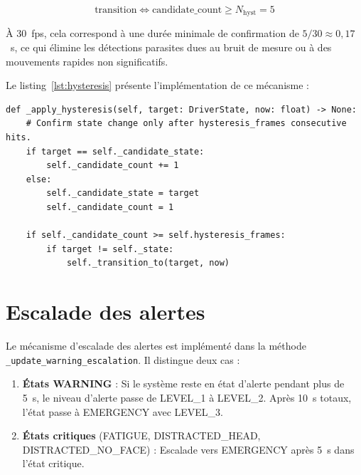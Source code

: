 \documentclass[12pt,a4paper]{report}
\begin{document}
\begin{equation}
  \text{transition} \iff \text{candidate\_count} \geq N_{\text{hyst}} = 5
\end{equation}

\`A 30~fps, cela correspond \`a une dur\'ee minimale de confirmation de $5/30 \approx 0{,}17$~s, ce qui \'elimine les d\'etections parasites dues au bruit de mesure ou \`a des mouvements rapides non significatifs.

Le listing~\ref{lst:hysteresis} pr\'esente l'impl\'ementation de ce m\'ecanisme :

\begin{lstlisting}[style=python, caption={M\'ecanisme d'hyst\'er\'esis (ecu\_decision.py)}, label=lst:hysteresis]
def _apply_hysteresis(self, target: DriverState, now: float) -> None:
    # Confirm state change only after hysteresis_frames consecutive hits.
    if target == self._candidate_state:
        self._candidate_count += 1
    else:
        self._candidate_state = target
        self._candidate_count = 1

    if self._candidate_count >= self.hysteresis_frames:
        if target != self._state:
            self._transition_to(target, now)
\end{lstlisting}

\section{Escalade des alertes}

Le m\'ecanisme d'escalade des alertes est impl\'ement\'e dans la m\'ethode \texttt{\_update\_warning\_escalation}. Il distingue deux cas :

\begin{enumerate}
  \item \textbf{\'Etats WARNING} : Si le syst\`eme reste en \'etat d'alerte pendant plus de 5~s, le niveau d'alerte passe de LEVEL\_1 \`a LEVEL\_2. Apr\`es 10~s totaux, l'\'etat passe \`a EMERGENCY avec LEVEL\_3.
  \item \textbf{\'Etats critiques} (FATIGUE, DISTRACTED\_HEAD, DISTRACTED\_NO\_FACE) : Escalade vers EMERGENCY apr\`es 5~s dans l'\'etat critique.
\end{enumerate}
\end{document}
